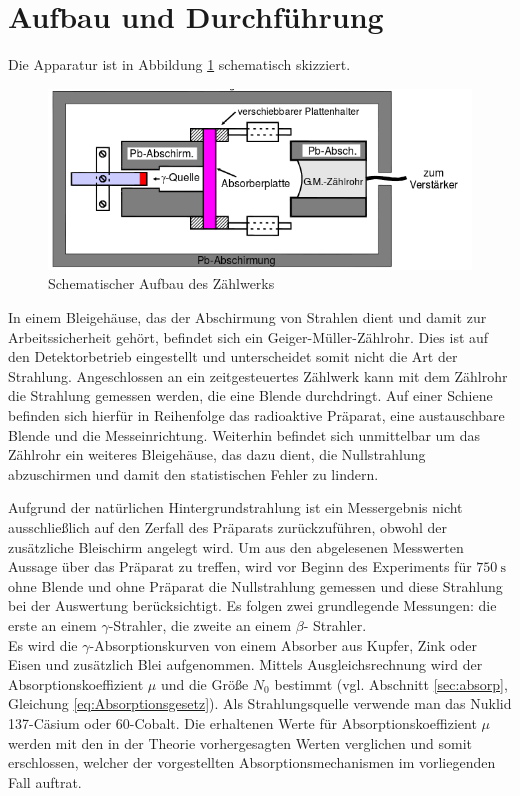 \section{Aufbau und Durchf\"uhrung}
\label{sec:Durchfuehrung}
Die Apparatur ist in Abbildung \ref{fig:aufbau} schematisch skizziert.
\begin{figure}[h]
	\centering
	\includegraphics[width=\textwidth]{Bilder/aufbau.png}
	\caption{Schematischer Aufbau des Zählwerks \cite{skript}}
	\label{fig:aufbau}
\end{figure}
In einem Bleigehäuse, das der Abschirmung von Strahlen dient und damit zur Arbeitssicherheit gehört, befindet sich ein Geiger-Müller-Zählrohr.
Dies ist auf den Detektorbetrieb eingestellt und unterscheidet somit nicht die Art der Strahlung.
Angeschlossen an ein zeitgesteuertes Zählwerk kann mit dem Zählrohr die Strahlung gemessen werden, die eine Blende durchdringt.
Auf einer Schiene befinden sich hierfür in Reihenfolge das radioaktive Präparat, eine austauschbare Blende und die Messeinrichtung.
Weiterhin befindet sich unmittelbar um das Zählrohr ein weiteres Bleigehäuse, das dazu dient, die Nullstrahlung abzuschirmen und damit den statistischen Fehler zu lindern.

Aufgrund der natürlichen Hintergrundstrahlung ist ein Messergebnis nicht ausschließlich auf den Zerfall des Präparats zurückzuführen, obwohl der zusätzliche Bleischirm angelegt wird.
Um aus den abgelesenen Messwerten Aussage über das Präparat zu treffen, wird vor Beginn des Experiments für $\SI{750}{\second}$ ohne Blende und ohne Präparat die Nullstrahlung gemessen und diese Strahlung bei der Auswertung berücksichtigt.
Es folgen zwei grundlegende Messungen: die erste an einem \texorpdfstring{$\gamma$}{Gamma}-Strahler, die zweite an einem \texorpdfstring{$\beta$}{Beta}-
Strahler.\\
Es wird die \texorpdfstring{$\gamma$}{Gamma}-Absorptionskurven von einem Absorber aus Kupfer, Zink oder Eisen und zusätzlich Blei aufgenommen.
Mittels Ausgleichsrechnung wird der Absorptionskoeffizient $\mu$ und die Größe $N_0$ bestimmt (vgl. Abschnitt \ref{sec:absorp}, Gleichung \eqref{eq:Absorptionsgesetz}). 
Als Strahlungsquelle verwende man das Nuklid 137-Cäsium oder 60-Cobalt. 
Die erhaltenen Werte für Absorptionskoeffizient $\mu$ werden mit den in der Theorie vorhergesagten Werten verglichen und somit erschlossen, 
welcher der vorgestellten Absorptionsmechanismen im vorliegenden Fall auftrat.

